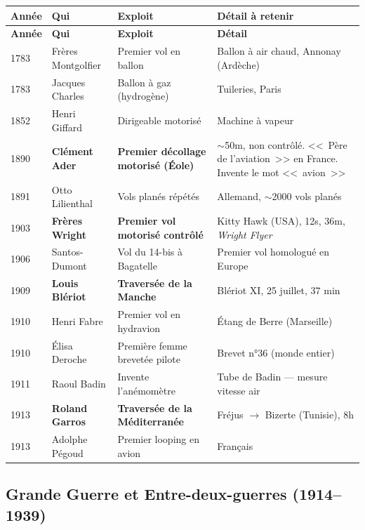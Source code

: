 \documentclass[11pt,a4paper]{article}
\begin{document}
\begin{longtable}{p{1cm}p{3.5cm}p{4cm}p{6cm}}
\toprule
\textbf{Année} & \textbf{Qui} & \textbf{Exploit} & \textbf{Détail à retenir} \\
\midrule
\endfirsthead
\toprule \textbf{Année} & \textbf{Qui} & \textbf{Exploit} & \textbf{Détail} \\ \midrule
\endhead
1783 & Frères Montgolfier & Premier vol en ballon & Ballon à air chaud, Annonay (Ardèche) \\
1783 & Jacques Charles & Ballon à gaz (hydrogène) & Tuileries, Paris \\
1852 & Henri Giffard & Dirigeable motorisé & Machine à vapeur \\
\rowcolor{aflight}
1890 & \textbf{Clément Ader} & \textbf{Premier décollage motorisé (Éole)} & $\sim$50m, non contrôlé. <<~Père de l'aviation~>> en France. Invente le mot <<~avion~>> \\
1891 & Otto Lilienthal & Vols planés répétés & Allemand, $\sim$2000 vols planés \\
\rowcolor{aflight}
1903 & \textbf{Frères Wright} & \textbf{Premier vol motorisé contrôlé} & Kitty Hawk (USA), 12s, 36m, \textit{Wright Flyer} \\
1906 & Santos-Dumont & Vol du 14-bis à Bagatelle & Premier vol homologué en Europe \\
\rowcolor{aflight}
1909 & \textbf{Louis Blériot} & \textbf{Traversée de la Manche} & Blériot XI, 25 juillet, 37 min \\
1910 & Henri Fabre & Premier vol en hydravion & Étang de Berre (Marseille) \\
1910 & Élisa Deroche & Première femme brevetée pilote & Brevet n°36 (monde entier) \\
1911 & Raoul Badin & Invente l'anémomètre & Tube de Badin --- mesure vitesse air \\
\rowcolor{aflight}
1913 & \textbf{Roland Garros} & \textbf{Traversée de la Méditerranée} & Fréjus $\to$ Bizerte (Tunisie), 8h \\
1913 & Adolphe Pégoud & Premier looping en avion & Français \\
\bottomrule
\end{longtable}

\subsection{Grande Guerre et Entre-deux-guerres (1914--1939)}
\end{document}
